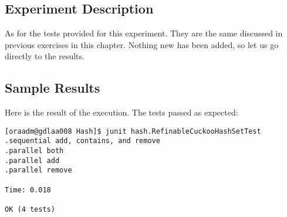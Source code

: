 \subsection{Experiment Description}
\par
As for the tests provided for this experiment. They are the same discussed in
previous exercises in this chapter. Nothing new has been added, so let us go
directly to the results.
\par
\subsection{Sample Results}
\par
Here is the result of the execution. The tests passed as expected:
\par
\hfill
\begin{verbatim}
[oraadm@gdlaa008 Hash]$ junit hash.RefinableCuckooHashSetTest
.sequential add, contains, and remove
.parallel both
.parallel add
.parallel remove

Time: 0.018

OK (4 tests)
\end{verbatim}
\hfill

